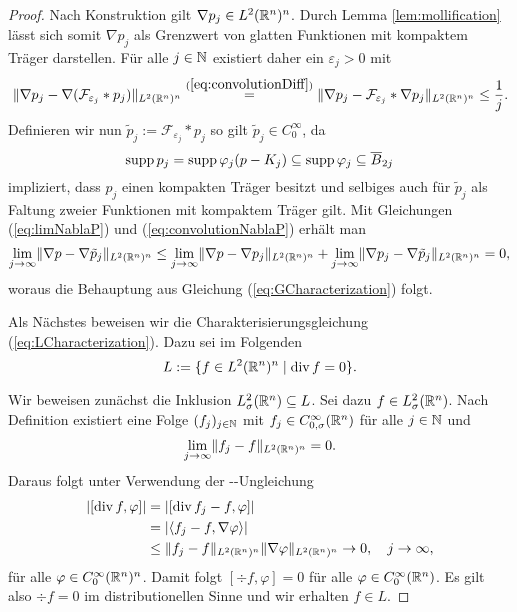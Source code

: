 \begin{proof}
  Nach Konstruktion gilt $\nabla p_j \in L^2(\mathbb{R}^n)^n$.
  Durch Lemma \ref{lem:mollification} lässt sich somit $\nabla p_j$ als Grenzwert von glatten Funktionen mit kompaktem Träger darstellen. Für alle $j \in \mathbb{N}$ existiert daher ein $\varepsilon_j > 0$ mit
  \begin{equation}
    \label{eq:convolutionNablaP}
  \lVert \nabla p_j - \nabla (\mathcal{F}_{\varepsilon_j} \ast p_j) \rVert_{L^2(\mathbb{R}^n)^n}
  \overset{(\ref{eq:convolutionDiff})}{=} \lVert \nabla p_j - \mathcal{F}_{\varepsilon_j} \ast \nabla p_j \rVert_{L^2(\mathbb{R}^n)^n}
  \leq \frac{1}{j}.
  \end{equation}
  Definieren wir nun $\tilde p_j := \mathcal{F}_{\varepsilon_j} \ast p_j$ so gilt $\tilde p_j \in C_0^\infty$, da 
  $$
  \operatorname{supp} p_j = \operatorname{supp} \varphi_j(p - K_j) 
  \subseteq \operatorname{supp} \varphi_j
  \subseteq \overline B_{2j}
  $$
  impliziert, dass $p_j$ einen kompakten Träger besitzt und selbiges auch für $\tilde p_j$ als Faltung zweier Funktionen mit kompaktem Träger gilt.
  Mit Gleichungen (\ref{eq:limNablaP}) und (\ref{eq:convolutionNablaP}) erhält man
  $$
  \lim_{j \to \infty} \lVert \nabla p - \nabla \tilde p_j \rVert_{L^2(\mathbb{R}^n)^n}
  \leq 
  \lim_{j \to \infty} \lVert \nabla p - \nabla p_j \rVert_{L^2(\mathbb{R}^n)^n} + \lim_{j \to \infty} \lVert \nabla p_j - \nabla \tilde p_j \rVert_{L^2(\mathbb{R}^n)^n}
  = 0, 
  $$
  woraus die Behauptung aus Gleichung (\ref{eq:GCharacterization}) folgt.

  Als Nächstes beweisen wir die Charakterisierungsgleichung (\ref{eq:LCharacterization}).
  Dazu sei im Folgenden
  $$
  L := \{ f \in L^2(\mathbb{R}^n)^n \mid \mathrm{div\,} f = 0 \}.
  $$

  Wir beweisen zunächst die Inklusion $L_\sigma^2(\mathbb{R}^n) \subseteq L$.
  Sei dazu $f \in L_\sigma^2(\mathbb{R}^n)$.
  Nach Definition existiert eine Folge $(f_j)_{j \in \mathbb{N}}$ mit $f_j \in C_{0,\sigma}^\infty(\mathbb{R}^n)$ für alle $j \in \mathbb{N}$ und 
  $$
  \lim_{j \to \infty} \lVert f_j - f \rVert_{L^2(\mathbb{R}^n)^n} = 0.
  $$
  Daraus folgt unter Verwendung der \cauchy\hyp{}\schwartz\hyp{}Ungleichung
  \begin{align*}
    |[\mathrm{div\,} f, \varphi] |
    &= |[\mathrm{div\,} f_j - f, \varphi] | \\
    &= |\langle f_j - f, \nabla \varphi \rangle| \\
    & \leq \lVert f_j - f \rVert_{L^2(\mathbb{R}^n)^n} \lVert \nabla \varphi \rVert_{L^2(\mathbb{R}^n)^n} 
    \to 0, \quad j \to \infty,
  \end{align*}
  für alle $\varphi \in C_0^\infty(\mathbb{R}^n)^n$.
  Damit folgt $[\div f, \varphi] = 0$ für alle $\varphi \in C_0^\infty(\mathbb{R}^n)$.
  Es gilt also $\div f = 0$ im distributionellen Sinne und wir erhalten $f \in L$.


\end{proof}
